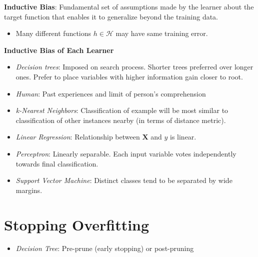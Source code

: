 \documentclass[10pt]{article}
\begin{document}
\begin{multicols}{3}
  \textbf{Inductive Bias}: Fundamental set of assumptions made by the learner about the target function that enables it to generalize beyond the training data.
  \begin{itemize}
    \item Many different functions $h\in\mathcal{H}$ may have same training error.
  \end{itemize}



  \textbf{Inductive Bias of Each Learner}
  \begin{itemize}
    \item \textit{Decision trees}: Imposed on search process. Shorter trees preferred over longer ones. Prefer to place variables with higher information gain closer to root.
    \item \textit{Human}: Past experiences and limit of person's comprehension
    \item \textit{k-Nearest Neighbors}: Classification of example will be most similar to classification of other instances nearby (in terms of distance metric).
    \item \textit{Linear Regression}: Relationship between $\mathbf{X}$ and $y$ is linear.
    \item \textit{Perceptron}: Linearly separable.  Each input variable votes independently towards final classification.
    \item \textit{Support Vector Machine}: Distinct classes tend to be separated by wide margins.
  \end{itemize}

  \section*{Stopping Overfitting}
  \begin{itemize}
    \item \textit{Decision Tree}: Pre-prune (early stopping) or post-pruning
  \end{itemize}
\end{multicols}
\end{document}
